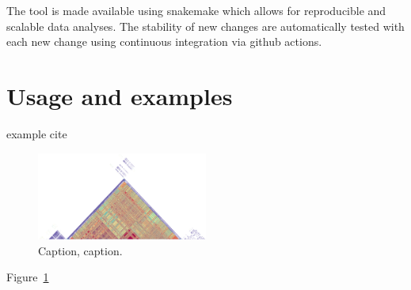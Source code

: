 \documentclass{bioinfo}
\begin{document}
The tool is made available using snakemake which allows for reproducible and scalable data analyses. The stability of new changes are automatically tested with each new change using continuous integration via github actions.

\section{Usage and examples}
\citealp{Boffelli03} example cite
\\




%
%

\begin{figure}[!tpb]%
\centerline{\includegraphics[width=0.5\textwidth,keepaspectratio]{../images/chr8.png}}
\caption{Caption, caption.}\label{fig:01}
\end{figure}
Figure~\ref{fig:01} 
\end{document}
